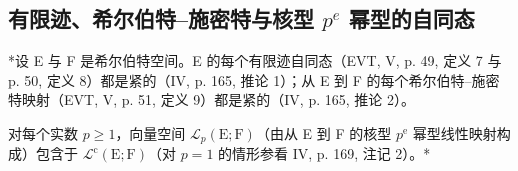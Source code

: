 \subsection{\texorpdfstring{有限迹、希尔伯特--施密特与核型 \(p^{e}\) 幂型的自同态}{有限迹、希尔伯特--施密特与核型 p\^{}\{e\} 幂型的自同态}}

*设 E 与 F 是希尔伯特空间。E 的每个有限迹自同态（EVT, V, p. 49, 定义 7 与 p. 50, 定义 8）都是紧的（IV, p. 165, 推论 1）；从 E 到 F 的每个希尔伯特--施密特映射（EVT, V, p. 51, 定义 9）都是紧的（IV, p. 165, 推论 2）。

对每个实数 \(p \geqslant 1\)，向量空间 \(\mathcal{L}_{p}(\mathrm{E};\mathrm{F})\)（由从 E 到 F 的核型 \(p^{\mathrm{e}}\) 幂型线性映射构成）包含于 \(\mathcal{L}^{\mathrm{c}}(\mathrm{E};\mathrm{F})\)（对 \(p = 1\) 的情形参看 IV, p. 169, 注记 2）。*

